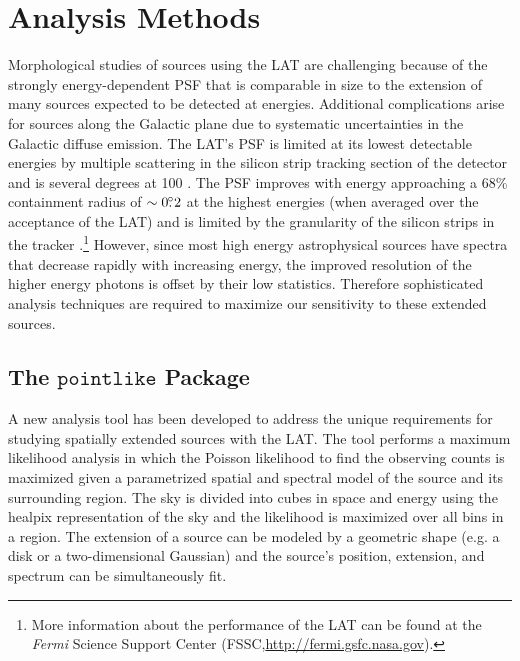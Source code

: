 \documentclass[12pt,preprint]{aastex}
\newcommand{\mev}{\text{MeV}\xspace}
\newcommand{\gev}{\text{GeV}\xspace}
\newcommand{\fermi}{\textit{Fermi}\xspace}
\newcommand{\pointlike}{\ensuremath{\mathtt{pointlike}}\xspace}
\begin{document}
\section{Analysis Methods}
\label{analysis_methods_section}

Morphological studies of sources using the LAT are challenging
because of the strongly energy-dependent PSF that is comparable in
size to the extension of many sources expected to be detected at
\gev energies.  Additional complications arise for sources along
the Galactic plane due to systematic uncertainties in the Galactic
diffuse emission.  The LAT's PSF is limited at its lowest detectable
energies by multiple scattering in the silicon strip tracking section
of the detector and is several degrees at 100 \mev.  The PSF improves
with energy approaching a 68\% containment radius of $\sim0\mbox{$.\!\!^\circ$}2$ at
the highest energies (when averaged over the acceptance of the LAT)
and is limited by the granularity of the silicon strips in the tracker
\citep{atwood_LAT_mission,on_orbit_calibration,lat_on_orbit_psf}.\footnote{More
information about the performance of the LAT can be found at the \fermi
Science Support Center (FSSC,\url{http://fermi.gsfc.nasa.gov}).} However,
since most high energy astrophysical sources have spectra that decrease
rapidly with increasing energy, the improved resolution of the higher
energy photons is offset by their low statistics. Therefore sophisticated
analysis techniques are required to maximize our sensitivity
to these extended sources.

\subsection{The \pointlike Package}

A new analysis tool has been developed to address the unique requirements
for studying spatially extended sources with the LAT. The tool performs
a maximum likelihood analysis in which the Poisson likelihood to find
the observing counts is maximized given a parametrized spatial and
spectral model of the source and its surrounding region.  The sky is
divided into cubes in space and energy using the healpix representation
of the sky \citep{healpix} and the likelihood is maximized over all bins
in a region.  The extension of a source can be modeled by a geometric
shape (e.g. a disk or a two-dimensional Gaussian) and the source's position, extension,
and spectrum can be simultaneously fit.
\end{document}
